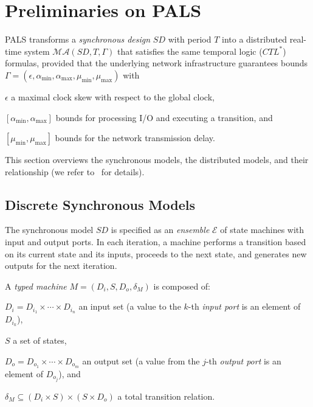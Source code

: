 
\section{Preliminaries on PALS}
\label{sec:pals}

PALS transforms 
 a \emph{synchronous design} $\mathit{SD}$ with  period $T$
into a %
distributed real-time system $\mathcal{MA}(\mathit{SD}, T, \Gamma)$
that satisfies the same temporal logic ($CTL^*$) formulas,
provided that the underlying network
infrastructure guarantees bounds %
$\Gamma = (\epsilon, \alpha_{\min}, \alpha_{\max}, \mu_{\min}, \mu_{\max})$
with
%
\begin{inparaenum}[(i)]
	\item $\epsilon$ a maximal clock skew  with respect to the global clock,
	\item $[\alpha_{\min},\alpha_{\max}]$  bounds for processing
          I/O and 
	executing a transition,   %
	and
	\item $[\mu_{\min}, \mu_{\max}]$ bounds  for the network transmission delay.
\end{inparaenum}
This section overviews the synchronous models, %
the distributed  models, %
 and their relationship %
(we refer to~\cite{mr-pals-journal,pals-tcs} for details).


\subsection{Discrete Synchronous Models}

The synchronous model $\mathit{SD}$ is specified  as 
an \emph{ensemble}
$\mathcal{E}$  of %
state machines with input and output ports.
In  each iteration, a machine performs a transition
based on its current state and its inputs, %
 proceeds to the next state, and generates new outputs for the next iteration.


\begin{definition}
A  \emph{typed machine}  $M = (D_i,S,D_o,\delta_M)$
is composed of:
%
\begin{inparaenum}[(i)]
	\item $D_i = D_{i_1} \times \cdots \times D_{i_n}$ an input set 
	(a value to the $k$-th \emph{input port}  is an element of  $D_{i_k}$), 
	\item $S$ a set of states, 
	\item $D_o =D_{o_1} \times \cdots \times D_{o_m}$ an output set
	(a value from the $j$-th \emph{output port} is an element of  $D_{o_j}$), and 
	\item $\delta_M \subseteq (D_i \times S) \times (S \times D_o)$ a total
	transition relation.
\end{inparaenum}  
\end{definition}




